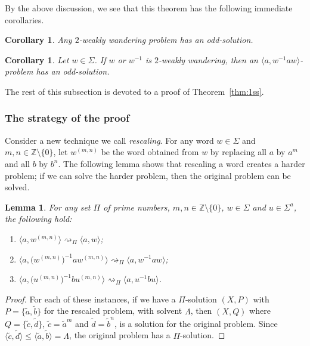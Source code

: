\documentclass[10pt,a4paper]{amsart}
\newtheorem{corollary}[theorem]{Corollary}
\newtheorem{lemma}[theorem]{Lemma}
\theoremstyle{definition}
\theoremstyle{definition}
\numberwithin{equation}{section}
\begin{document}
By the above discussion, we see that this theorem has the following immediate corollaries.

\begin{corollary} Any $2$-weakly wandering problem has an odd-solution.
\end{corollary}

\begin{corollary} Let $w\in \Sigma$. If $w$ or $w^{-1}$ is $2$-weakly wandering, then an $\langle a, w^{-1}aw\rangle$-problem has an odd-solution.
\end{corollary}

The rest of this subsection is devoted to a proof of Theorem~\ref{thm:1ss}. 


\subsubsection{The strategy of the proof}

Consider a new technique we call {\em rescaling}. For any word $w\in \Sigma$ and $m,n\in\mathbb{Z}\setminus\{0\}$, let $w^{(m,n)}$ be the word obtained from $w$ by replacing all $a$ by $a^m$ and all $b$ by $b^n$. The following lemma shows that rescaling a word creates a harder problem; if we can solve the harder problem, then the original problem can be solved.

\begin{lemma}\label{lem:rescaling} For any set $\Pi$ of prime numbers, $m, n\in\mathbb{Z}\setminus\{0\}$, $w\in \Sigma$ and $u\in \Sigma^a$, the following hold:
\begin{enumerate}
\item[\rm (i)] $\big\langle a, w^{(m,n)}\big\rangle\rightsquigarrow_\Pi\langle a, w\rangle$;
\item[\rm (ii)] $\big\langle a, \big(w^{(m,n)}\big)^{-1}aw^{(m,n)}\big\rangle\rightsquigarrow_{\Pi}\langle a, w^{-1}aw\rangle$;
\item[\rm (iii)] $\big\langle a, \big(u^{(m,n)}\big)^{-1}bu^{(m,n)}\big\rangle\rightsquigarrow_{\Pi}\langle a, u^{-1}bu\rangle$.
\end{enumerate}
\end{lemma}

\begin{proof} For each of these instances, if we have a $\Pi$-solution $(X, P)$ with $P=\{\tilde{a}, \tilde{b}\}$ for the rescaled problem, with solvent $\Lambda$, then $(X, Q)$ where $Q=\{\tilde{c}, \tilde{d}\}$, $\tilde{c}=\tilde{a}^m$ and $\tilde{d}=\tilde{b}^n$, is a solution for the original problem. Since $\langle \tilde{c}, \tilde{d}\rangle\leq \langle \tilde{a}, \tilde{b}\rangle=\Lambda$, the original problem has a $\Pi$-solution.
\end{proof}
\end{document}
